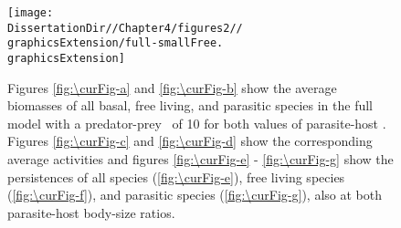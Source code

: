 \documentclass[/home/nkappler/Research/Dissertation/dissertation.tex]{subfiles}
\begin{document}
\begin{bibunit}
\begin{figure} 
    \texttt{[image: \\DissertationDir//Chapter4/figures2//\\graphicsExtension/full-smallFree.\\graphicsExtension]} 
    {%
    } 
    \caption[Dynamic results, parasite model, small free livers]{Figures \ref{fig:\curFig-a} and \ref{fig:\curFig-b} show the
        average biomasses of all basal, free living, and parasitic species in
        the full model with a predator-prey \aBSR~of 10 for both values of
        parasite-host \BSR. Figures \ref{fig:\curFig-c} and \ref{fig:\curFig-d}
        show the corresponding average activities and figures
        \ref{fig:\curFig-e} - \ref{fig:\curFig-g} show the persistences of all
        species (\ref{fig:\curFig-e}), free living species
        (\ref{fig:\curFig-f}), and parasitic species (\ref{fig:\curFig-g}),
        also at both parasite-host body-size ratios.\label{fig:full-smallFree}}
    \end{figure}





\edef\bigBioFracBioDecFree{\pgfmathresult}

\edef\smallBioFracBioDecFree{\pgfmathresult}

 \edef\bigBioPerDelPara{\pgfmathresult}

 \edef\smallBioPerDelPara{\pgfmathresult}

\bigParaTab \edef\bigMeanBioPara{\pgfplotsretval}


\end{bibunit}
\end{document}
